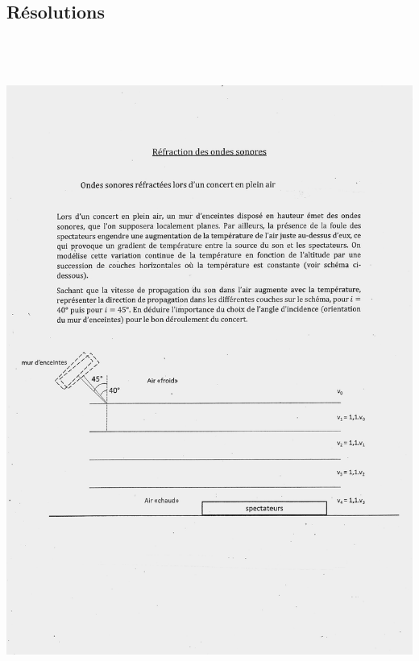 \subsection{Résolutions}

\includegraphics[width=18.501cm,height=21.812cm]{Pictures/100000010000133200001AE8CBE600732ABF4D48.png}

